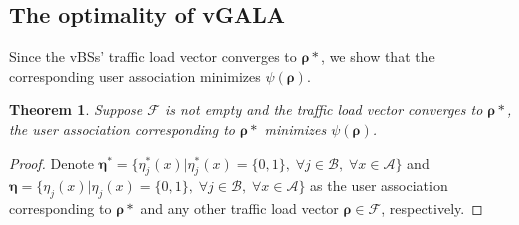 \documentclass[journal]{IEEEtran}
\newtheorem{theorem}{Theorem}
\theoremstyle{definition}
\begin{document}
\subsection{The optimality of vGALA}
\label{subsec:optimal}
Since the vBSs' traffic load vector converges to $\boldsymbol{\rho}{*}$, we show that the corresponding user association minimizes $\psi(\boldsymbol{\rho})$.
\begin{theorem}
\label{thm:opt_vgala}
Suppose $\mathcal{F}$ is not empty and the traffic load vector converges to $\boldsymbol{\rho}{*}$, the user association corresponding to $\boldsymbol{\rho}{*}$ minimizes $\psi(\boldsymbol{\rho})$.
\end{theorem}
\begin{proof}
\label{prf:opt_vgala}
Denote $\boldsymbol{\eta}^{*}=\{\eta^{*}_{j}(x)|\eta^{*}_{j}(x)=\{0,1\},\; \forall j \in\mathcal{B}, \;\forall x\in \mathcal{A}\}$ and $\boldsymbol{\eta}=\{\eta_{j}(x)|\eta_{j}(x)=\{0,1\},\; \forall j \in\mathcal{B}, \;\forall x\in \mathcal{A}\}$ as the user association corresponding to $\boldsymbol{\rho}{*}$ and any other traffic load vector $\boldsymbol{\rho} \in \mathcal{F}$, respectively.


\end{proof}
\end{document}
